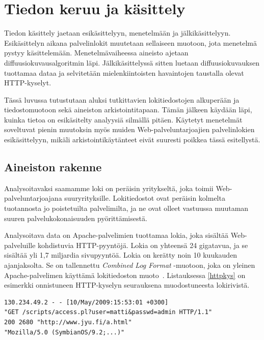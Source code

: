 
\chapter{Tiedon keruu ja käsittely}

Tiedon käsittely jaetaan esikäsittelyyn, menetelmään ja
jälkikäsittelyyn. Esikäsittelyn aikana palvelinlokit muutetaan sellaiseen
muotoon, jota menetelmä pystyy käsittelemään. Menetelmävaiheessa
aineisto ajetaan diffuusiokuvausalgoritmin läpi. Jälkikäsittelyssä sitten
luetaan diffuusiokuvauksen tuottamaa dataa ja selvitetään
mielenkiintoisten havaintojen taustalla olevat HTTP-kyselyt.

Tässä luvussa tutustutaan aluksi tutkittavien lokitiedostojen
alkuperään ja tiedostomuotoon sekä aineiston arkistointitapaan. Tämän
jälkeen käydään läpi, kuinka tietoa on esikäsitelty analyysiä silmällä
pitäen. Käytetyt menetelmät soveltuvat pienin muutoksin myös muiden
Web-palveluntarjoajien palvelinlokien esikäsittelyyn, mikäli
arkistointikäytänteet eivät suuresti poikkea tässä esitellystä.

\section{Aineiston rakenne}
\label{sec:lahtokohta}

Analysoitavaksi saamamme loki on peräisin yritykseltä, joka toimii
Web-\-palveluntarjoajana suuryrityksille. Lokitiedostot ovat peräisin
kolmelta tuotannosta jo poistetuilta palvelimilta, ja ne ovat olleet
vastuussa muutaman suuren palvelukokonaisuuden pyörittämisestä.

Analysoitava data on Apache-palvelimien tuottamaa lokia, joka sisältää
Web-palveluille kohdistuvia HTTP-pyyntöjä. Lokia on yhteensä 24
gigatavua, ja se sisältää yli 1,7 miljardia sivupyyntöä.
Lokia on kerätty noin 10 kuukauden
ajanjaksolta. Se on tallennettu \textit{Combined Log Format} -muotoon,
joka on yleinen Apache-palvelimen käyttämä lokitiedoston
muoto~\cite{combined}. Listauksessa \ref{httpkys} on esimerkki onnistuneen HTTP-kyselyn seurauksena muodostuneesta lokirivistä.


\begin{lstlisting}[float=h,caption=Esimerkki onnistuneesta HTTP-kyselystä.,label=httpkys,aboveskip=0.5cm]
130.234.49.2 - - [10/May/2009:15:53:01 +0300]
"GET /scripts/access.pl?user=matti&passwd=admin HTTP/1.1"
200 2680 "http://www.jyu.fi/a.html"
"Mozilla/5.0 (SymbianOS/9.2;...)"
\end{lstlisting}

